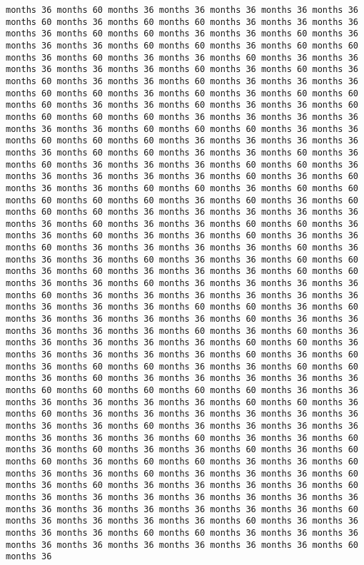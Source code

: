 \documentclass[11pt]{article}
\begin{document}
\begin{Verbatim}[commandchars=\\\{\}, frame=single, framerule=2mm, rulecolor=\color{outerrorbackground}]
months 36 months 60 months 36 months 36 months 36 months 36 months 36 months 60 months 36 months 60 months 60 months 36 months 36 months 36 months 36 months 60 months 60 months 36 months 36 months 60 months 36 months 36 months 36 months 60 months 60 months 36 months 60 months 60 months 36 months 60 months 36 months 36 months 60 months 36 months 36 months 36 months 36 months 36 months 60 months 36 months 60 months 36 months 60 months 36 months 36 months 60 months 36 months 36 months 36 months 60 months 60 months 36 months 60 months 36 months 60 months 60 months 60 months 36 months 36 months 60 months 36 months 36 months 60 months 60 months 60 months 60 months 36 months 36 months 36 months 36 months 36 months 36 months 60 months 60 months 60 months 36 months 36 months 60 months 60 months 60 months 36 months 36 months 36 months 36 months 36 months 60 months 60 months 36 months 36 months 60 months 36 months 60 months 36 months 36 months 36 months 60 months 60 months 36 months 36 months 36 months 36 months 36 months 60 months 36 months 60 months 36 months 36 months 60 months 60 months 36 months 60 months 60 months 60 months 60 months 60 months 36 months 60 months 36 months 60 months 60 months 60 months 36 months 36 months 36 months 36 months 36 months 36 months 60 months 36 months 36 months 60 months 60 months 36 months 36 months 60 months 36 months 36 months 60 months 36 months 36 months 60 months 36 months 36 months 36 months 36 months 60 months 36 months 36 months 36 months 60 months 36 months 36 months 60 months 60 months 36 months 60 months 36 months 36 months 36 months 60 months 60 months 36 months 36 months 60 months 36 months 36 months 36 months 36 months 60 months 36 months 36 months 36 months 36 months 36 months 36 months 36 months 36 months 36 months 60 months 60 months 36 months 60 months 36 months 36 months 36 months 36 months 60 months 36 months 36 months 36 months 36 months 36 months 60 months 36 months 60 months 36 months 36 months 36 months 36 months 36 months 60 months 60 months 36 months 36 months 36 months 36 months 36 months 60 months 36 months 60 months 36 months 60 months 60 months 36 months 36 months 60 months 60 months 36 months 60 months 36 months 36 months 36 months 36 months 36 months 60 months 60 months 60 months 60 months 60 months 36 months 36 months 36 months 36 months 36 months 36 months 60 months 60 months 36 months 60 months 36 months 36 months 36 months 36 months 36 months 36 months 36 months 36 months 60 months 36 months 36 months 36 months 36 months 36 months 36 months 36 months 60 months 36 months 36 months 60 months 36 months 60 months 36 months 36 months 60 months 36 months 60 months 60 months 36 months 60 months 60 months 36 months 36 months 60 months 36 months 36 months 60 months 36 months 36 months 36 months 60 months 36 months 60 months 36 months 36 months 36 months 36 months 60 months 36 months 36 months 36 months 36 months 36 months 36 months 36 months 36 months 36 months 36 months 36 months 36 months 36 months 60 months 36 months 36 months 36 months 36 months 60 months 36 months 36 months 36 months 36 months 60 months 60 months 36 months 36 months 36 months 36 months 36 months 36 months 36 months 36 months 36 months 60 months 36 
\end{Verbatim}
\end{document}
